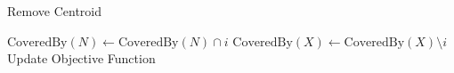 \begin{algorithm}[H]
    \caption{Remove Centroid}
    \begin{algorithmic}[1]
	                   	\State $\text{CoveredBy}(N) \gets \text{CoveredBy}(N) \cap i$
                        \State $\text{CoveredBy}(X) \gets \text{CoveredBy}(X) \setminus i$
                        \State Update Objective Function
                    \EndIf
                \EndFor
            \EndFor
        \EndProcedure
    \end{algorithmic}
    \label{alg:bb_rc}
\end{algorithm}